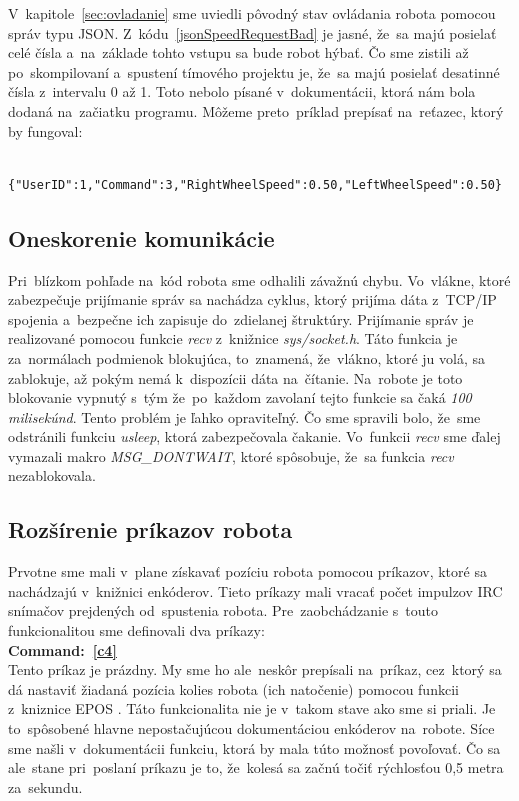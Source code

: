 V~kapitole~\ref{sec:ovladanie} sme uviedli pôvodný stav ovládania robota pomocou správ typu JSON.
Z~kódu~\ref{jsonSpeedRequestBad} je jasné, že~sa majú posielať celé čísla a~na~základe tohto vstupu sa bude robot hýbať. Čo sme zistili až
po~skompilovaní a~spustení tímového projektu je, že~sa majú posielať desatinné čísla z~intervalu 0 až 1. Toto nebolo písané
v~dokumentácii, ktorá nám bola dodaná na~začiatku programu. Môžeme preto~príklad prepísať na~reťazec, ktorý by fungoval:

	\label{jsonSpeedRequestGood}
	\begin{lstlisting}
			{"UserID":1,"Command":3,"RightWheelSpeed":0.50,"LeftWheelSpeed":0.50}
	\end{lstlisting}

\subsection{Oneskorenie komunikácie}
\label{subsec:communicationDelay}

Pri~blízkom pohľade na~kód robota sme odhalili závažnú chybu. Vo~vlákne, ktoré zabezpečuje prijímanie správ sa nachádza
cyklus, ktorý prijíma dáta z~TCP/IP spojenia a~bezpečne ich zapisuje do~zdielanej štruktúry. Prijímanie správ je realizované
pomocou funkcie \textit{recv} z~knižnice \textit{sys/socket.h}. Táto funkcia je za~normálach podmienok blokujúca, to~znamená,
že~vlákno, ktoré ju volá, sa zablokuje, až pokým nemá k~dispozícii dáta na~čítanie. Na~robote je toto blokovanie
vypnutý s~tým že~po~každom zavolaní tejto funkcie sa čaká \textit{100 milisekúnd}. Tento problém je ľahko opraviteľný.
Čo sme spravili bolo, že~sme odstránili funkciu \textit{usleep}, ktorá zabezpečovala čakanie. Vo~funkcii \textit{recv}
sme ďalej vymazali makro \textit{MSG\_DONTWAIT}, ktoré spôsobuje, že~sa funkcia \textit{recv} nezablokovala.

\subsection{Rozšírenie príkazov robota}
\label{subsec:extendRobotCommands}

Prvotne sme mali v~plane získavať pozíciu robota pomocou príkazov, ktoré sa nachádzajú v~knižnici enkóderov.
Tieto príkazy mali vracať počet impulzov IRC snímačov prejdených od~spustenia robota.
Pre~zaobchádzanie s~touto funkcionalitou sme definovali dva príkazy:\\

\noindent \textbf{Command:~\ref{c4}} \\
\indent Tento príkaz je prázdny. My sme ho ale~neskôr prepísali na~príkaz, cez~ktorý sa dá nastaviť
žiadaná pozícia kolies robota (ich natočenie) pomocou funkcii z~kniznice EPOS \cite{EPOSdoc}.
Táto funkcionalita nie je v~takom stave ako sme si priali. Je to~spôsobené hlavne nepostačujúcou dokumentáciou enkóderov na~robote. Síce sme našli
v~dokumentácii funkciu, ktorá by mala túto možnosť povoľovať. Čo sa ale~stane pri~poslaní príkazu je to, že~kolesá sa začnú točiť rýchlosťou
0,5 metra za~sekundu.\\

